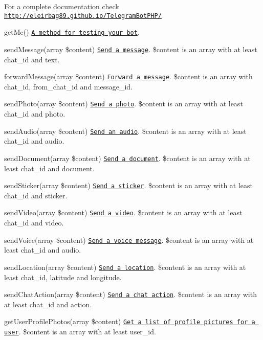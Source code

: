 For a complete documentation check \href{http://eleirbag89.github.io/TelegramBotPHP/}{\tt http\-://eleirbag89.\-github.\-io/\-Telegram\-Bot\-P\-H\-P/}
\begin{DoxyItemize}
\item get\-Me() \href{https://core.telegram.org/bots/api#getme}{\tt A method for testing your bot}.
\item send\-Message(array \$content) \href{https://core.telegram.org/bots/api#sendmessage}{\tt Send a message}. \$content is an array with at least chat\-\_\-id and text.
\item forward\-Message(array \$content) \href{https://core.telegram.org/bots/api#forwardmessage}{\tt Forward a message}. \$content is an array with chat\-\_\-id, from\-\_\-chat\-\_\-id and message\-\_\-id.
\item send\-Photo(array \$content) \href{https://core.telegram.org/bots/api#sendphoto}{\tt Send a photo}. \$content is an array with at least chat\-\_\-id and photo.
\item send\-Audio(array \$content) \href{https://core.telegram.org/bots/api#sendaudio}{\tt Send an audio}. \$content is an array with at least chat\-\_\-id and audio.
\item send\-Document(array \$content) \href{https://core.telegram.org/bots/api#senddocument}{\tt Send a document}. \$content is an array with at least chat\-\_\-id and document.
\item send\-Sticker(array \$content) \href{https://core.telegram.org/bots/api#sendsticker}{\tt Send a sticker}. \$content is an array with at least chat\-\_\-id and sticker.
\item send\-Video(array \$content) \href{https://core.telegram.org/bots/api#sendvideo}{\tt Send a video}. \$content is an array with at least chat\-\_\-id and video.
\item send\-Voice(array \$content) \href{https://core.telegram.org/bots/api#sendvoice}{\tt Send a voice message}. \$content is an array with at least chat\-\_\-id and audio.
\item send\-Location(array \$content) \href{https://core.telegram.org/bots/api#sendlocation}{\tt Send a location}. \$content is an array with at least chat\-\_\-id, latitude and longitude.
\item send\-Chat\-Action(array \$content) \href{https://core.telegram.org/bots/api#sendchataction}{\tt Send a chat action}. \$content is an array with at least chat\-\_\-id and action.
\item get\-User\-Profile\-Photos(array \$content) \href{https://core.telegram.org/bots/api#getuserprofilephotos}{\tt Get a list of profile pictures for a user}. \$content is an array with at least user\-\_\-id.

\end{DoxyItemize}
